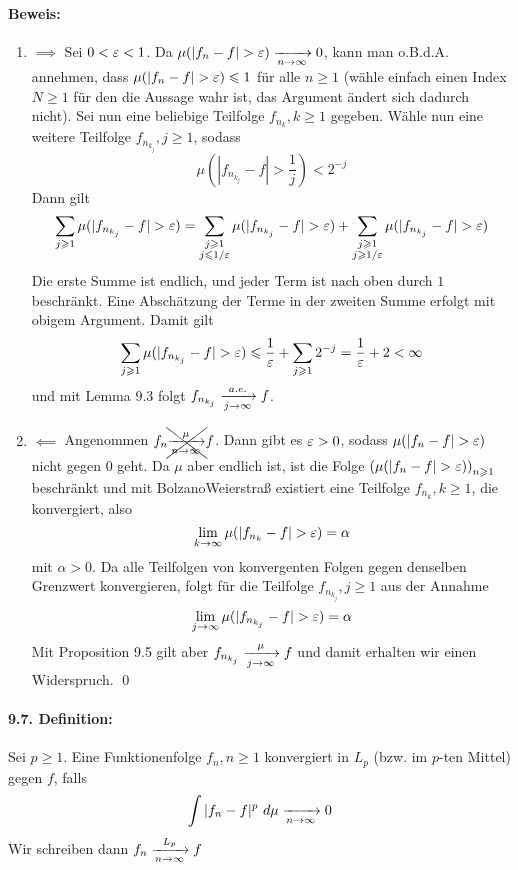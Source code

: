 \documentclass[11pt]{report}
\begin{document}
\paragraph{Beweis:}
\begin{enumerate}[label=\Roman*.]
    \item $\implies$\newline
    Sei $0<\varepsilon<1$. Da $\mu(|f_n-f|>\eps)\nto{}{n\to\infty}0$, kann man o.B.d.A. annehmen, dass $\mu(|f_n-f|>\eps)\leq1$ f\"ur alle $n\geq1$ (w\"ahle einfach einen Index $N\geq1$ f\"ur den die Aussage wahr ist, das Argument \"andert sich dadurch nicht). Sei nun eine beliebige Teilfolge $f_{n_k},k\geq1$ gegeben. W\"ahle nun eine weitere Teilfolge $f_{n_{k_j}},j\geq1$, sodass 
    $$\mu\left(|f_{n_{k_j}}-f|>\dfrac{1}{j}\right)<2^{-j}$$
    Dann gilt 
    $$\sum_{j\geq1}\mu(|f_{n_{k_j}}-f|>\eps)=\sum_{\substack{j\geq1\\ j\leq 1/\eps}}\mu(|f_{n_{k_j}}-f|>\eps)+\sum_{\substack{j\geq1\\ j\geq 1/\eps}}\mu(|f_{n_{k_j}}-f|>\eps)$$
    Die erste Summe ist endlich, und jeder Term ist nach oben durch $1$ beschr\"ankt. Eine Absch\"atzung der Terme in der zweiten Summe erfolgt mit obigem Argument.
    Damit gilt
    $$\sum_{j\geq1}\mu(|f_{n_{k_j}}-f|>\eps)\leq\dfrac{1}{\eps}+\sum_{j\geq1}2^{-j}=\dfrac{1}{\eps}+2<\infty$$
    und mit Lemma 9.3 folgt $f_{n_{k_j}}\nto{a.e.}{j\to\infty}f$.
    \item $\impliedby$\newline
    Angenommen $f_n\xcancel{\nto{\mu}{n\to\infty}}f$. Dann gibt es $\varepsilon>0$, sodass $\mu(|f_n-f|>\eps)$ nicht gegen $0$ geht. Da $\mu$ aber endlich ist, ist die Folge $\left(\mu(|f_n-f|>\eps)\right)_{n\geq1}$ beschr\"ankt  und mit Bolzano\textendash Weierstra\ss{} existiert eine Teilfolge $f_{n_k},k\geq1$, die konvergiert, also 
    $$\lim_{k\to\infty}\mu(|f_{n_k}-f|>\eps)=\alpha$$
    mit $\alpha>0$. %
    Da alle Teilfolgen von konvergenten Folgen gegen denselben Grenzwert konvergieren, folgt f\"ur die Teilfolge $f_{n_{k_j}},j\geq1$ aus der Annahme
    $$\lim_{j\to\infty}\mu(|f_{n_{k_j}}-f|>\eps)=\alpha$$
    Mit Proposition 9.5 gilt aber $f_{n_{k_j}}\nto{\mu}{j\to\infty}f$ und damit erhalten wir einen Widerspruch. \qed
\end{enumerate}

\paragraph{9.7. Definition:} Sei $p\geq1$. Eine Funktionenfolge $f_n,n\geq1$ konvergiert in $L_p$ (bzw. im $p$-ten Mittel) gegen $f$, falls
$$\int|f_n-f|^p\ d\mu\nto{}{n\to\infty}0$$
Wir schreiben dann $f_n\nto{L_p}{n\to\infty}f$
\end{document}
